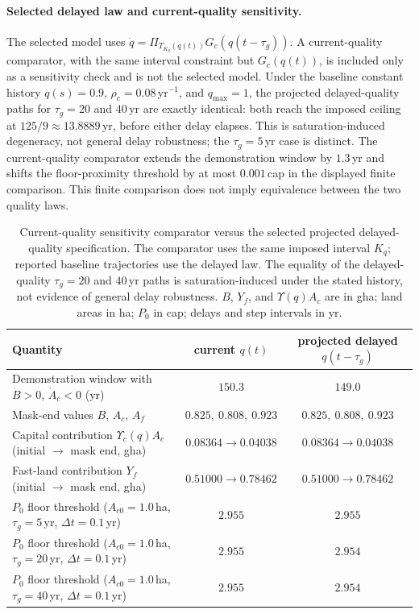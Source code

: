\documentclass[11pt,a4paper]{article}
\newcommand{\Ups}{\Upsilon_c}
\begin{document}
\paragraph{Selected delayed law and current-quality sensitivity.} The selected model uses $\dot q=\Pi_{T_{K_q}(q(t))}G_c(q(t-\tau_g))$. A current-quality comparator, with the same interval constraint but $G_c(q(t))$, is included only as a sensitivity check and is not the selected model. Under the baseline constant history $q(s)=0.9$, $\rho_c=0.08$\,yr$^{-1}$, and $q_{\max}=1$, the projected delayed-quality paths for $\tau_g=20$ and $40$\,yr are exactly identical: both reach the imposed ceiling at $125/9\approx13.8889$\,yr, before either delay elapses. This is saturation-induced degeneracy, not general delay robustness; the $\tau_g=5$\,yr case is distinct. The current-quality comparator extends the demonstration window by $1.3$\,yr and shifts the floor-proximity threshold by at most $0.001$\,cap in the displayed finite comparison. This finite comparison does not imply equivalence between the two quality laws.

\begin{table}[htbp]
\centering\small
\caption{Current-quality sensitivity comparator versus the selected projected delayed-quality specification. The comparator uses the same imposed interval $K_q$; reported baseline trajectories use the delayed law. The equality of the delayed-quality $\tau_g=20$ and $40$\,yr paths is saturation-induced under the stated history, not evidence of general delay robustness. $B$, $Y_f$, and $\Upsilon(q)A_c$ are in gha; land areas in ha; $P_0$ in cap; delays and step intervals in yr.}
\label{tab:si_delay}
\begin{tabularx}{\textwidth}{>{\raggedright\arraybackslash}Xcc}
\toprule
Quantity & current $q(t)$ & projected delayed $q(t-\tau_g)$ \\
\midrule
Demonstration window with $\dot B>0$, $\dot A_c<0$ (yr) & $150.3$ & $149.0$ \\
Mask-end values $B$, $A_c$, $A_f$ & $0.825,\ 0.808,\ 0.923$ & $0.825,\ 0.808,\ 0.923$ \\
Capital contribution $\Ups(q)A_c$ (initial $\to$ mask end, gha) & $0.08364\to0.04038$ & $0.08364\to0.04038$ \\
Fast-land contribution $Y_f$ (initial $\to$ mask end, gha) & $0.51000\to0.78462$ & $0.51000\to0.78462$ \\
$P_0$ floor threshold ($A_{c0}=1.0$\,ha, $\tau_g=5$\,yr, $\Delta t=0.1$\,yr) & $2.955$ & $2.955$ \\
$P_0$ floor threshold ($A_{c0}=1.0$\,ha, $\tau_g=20$\,yr, $\Delta t=0.1$\,yr) & $2.955$ & $2.954$ \\
$P_0$ floor threshold ($A_{c0}=1.0$\,ha, $\tau_g=40$\,yr, $\Delta t=0.1$\,yr) & $2.955$ & $2.954$ \\
\bottomrule
\end{tabularx}
\end{table}
\end{document}
